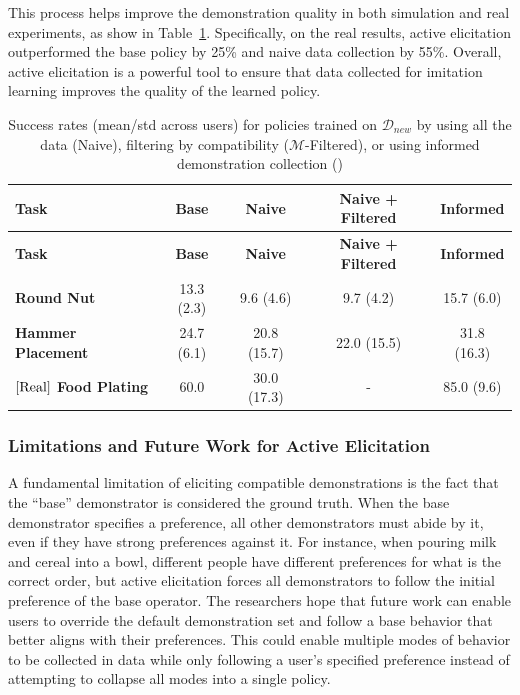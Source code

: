 \documentclass[
  letterpaper,
  numbers=noenddot,
  DIV=11]{scrreprt}
\theoremstyle{definition}
\theoremstyle{plain}
\theoremstyle{plain}
\theoremstyle{remark}
\begin{document}
This process helps improve the demonstration quality in both simulation
and real experiments, as show in
Table~\ref{tbl-active_elicitation_results}. Specifically, on the real
results, active elicitation outperformed the base policy by 25\% and
naive data collection by 55\%. Overall, active elicitation is a powerful
tool to ensure that data collected for imitation learning improves the
quality of the learned policy.

\begin{longtable}[]{@{}lcccc@{}}
\caption{Success rates (mean/std across users) for policies trained on
\(\mathcal{D}_{new}\) by using all the data (Naive), filtering by
compatibility (\(\mathcal{M}\)-Filtered), or using informed
demonstration collection ()}\label{tbl-active_elicitation_results}\tabularnewline
\toprule\noalign{}
\textbf{Task} & \textbf{Base} & \textbf{Naive} & \textbf{Naive +
Filtered} & \textbf{Informed} \\
\midrule\noalign{}
\endfirsthead
\toprule\noalign{}
\textbf{Task} & \textbf{Base} & \textbf{Naive} & \textbf{Naive +
Filtered} & \textbf{Informed} \\
\midrule\noalign{}
\endhead
\bottomrule\noalign{}
\endlastfoot
\textbf{Round Nut} & 13.3 (2.3) & 9.6 (4.6) & 9.7 (4.2) & 15.7 (6.0) \\
\textbf{Hammer Placement} & 24.7 (6.1) & 20.8 (15.7) & 22.0 (15.5) &
31.8 (16.3) \\
\textbf{\(\left[ \textup{Real} \right]\) Food Plating} & 60.0 & 30.0
(17.3) & - & 85.0 (9.6) \\
\end{longtable}

\subsubsection*{Limitations and Future Work for Active
Elicitation}\label{limitations-and-future-work-for-active-elicitation}

A fundamental limitation of eliciting compatible demonstrations is the
fact that the ``base'' demonstrator is considered the ground truth. When
the base demonstrator specifies a preference, all other demonstrators
must abide by it, even if they have strong preferences against it. For
instance, when pouring milk and cereal into a bowl, different people
have different preferences for what is the correct order, but active
elicitation forces all demonstrators to follow the initial preference of
the base operator. The researchers hope that future work can enable
users to override the default demonstration set and follow a base
behavior that better aligns with their preferences. This could enable
multiple modes of behavior to be collected in data while only following
a user's specified preference instead of attempting to collapse all
modes into a single policy.
\end{document}
